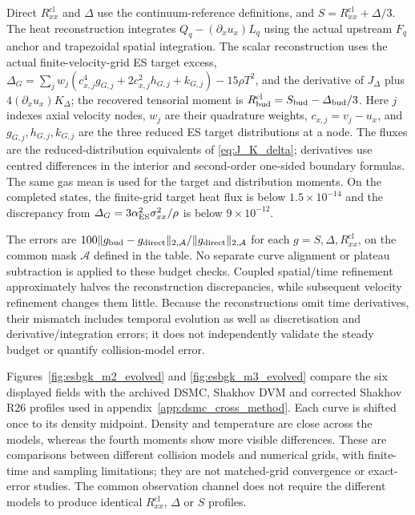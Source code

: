 \documentclass[lineno,paper]{JFM-FLM_Au}
\newenvironment{revision}{\nolinenumbers\begin{tcolorbox}[breakable,colback=revisionyellow,colframe=revisionyellow,boxrule=0pt,arc=0pt,left=5pt,right=5pt,top=5pt,bottom=5pt,before skip=6pt,after skip=6pt]\captionsetup{width=\linewidth}}{\end{tcolorbox}\linenumbers}
\newenvironment{revision}{}{}
\newcommand{\cl}{\mathrm{cl}}
\begin{document}
\begin{revision}
Direct $R^{\cl}_{xx}$ and $\Delta$ use the continuum-reference definitions, and $S=R^{\cl}_{xx}+\Delta/3$. The heat reconstruction integrates $Q_q-(\partial_xu_x)L_q$ using the actual upstream $F_q$ anchor and trapezoidal spatial integration. The scalar reconstruction uses the actual finite-velocity-grid ES target excess, $\Delta_G=\sum_j w_j(c_{x,j}^4g_{G,j}+2c_{x,j}^2h_{G,j}+k_{G,j})-15\rho T^2$, and the derivative of $J_\Delta$ plus $4(\partial_xu_x)K_\Delta$; the recovered tensorial moment is $R_{\rm bud}^{\cl}=S_{\rm bud}-\Delta_{\rm bud}/3$. Here $j$ indexes axial velocity nodes, $w_j$ are their quadrature weights, $c_{x,j}=v_j-u_x$, and $g_{G,j},h_{G,j},k_{G,j}$ are the three reduced ES target distributions at a node. The fluxes are the reduced-distribution equivalents of \eqref{eq:J_K_delta}; derivatives use centred differences in the interior and second-order one-sided boundary formulas. The same gas mean is used for the target and distribution moments. On the completed states, the finite-grid target heat flux is below $1.5\times10^{-14}$ and the discrepancy from $\Delta_G=3\alpha_{\rm ES}^2\sigma_{xx}^2/\rho$ is below $9\times10^{-12}$.

The errors are $100\|g_{\rm bud}-g_{\rm direct}\|_{2,\mathcal A}/\|g_{\rm direct}\|_{2,\mathcal A}$ for each $g=S,\Delta,R^{\cl}_{xx}$, on the common mask $\mathcal A$ defined in the table. No separate curve alignment or plateau subtraction is applied to these budget checks. Coupled spatial/time refinement approximately halves the reconstruction discrepancies, while subsequent velocity refinement changes them little. Because the reconstructions omit time derivatives, their mismatch includes temporal evolution as well as discretisation and derivative/integration errors; it does not independently validate the steady budget or quantify collision-model error.

Figures~\ref{fig:esbgk_m2_evolved} and \ref{fig:esbgk_m3_evolved} compare the six displayed fields with the archived DSMC, Shakhov DVM and corrected Shakhov R26 profiles used in appendix~\ref{app:dsmc_cross_method}. Each curve is shifted once to its density midpoint. Density and temperature are close across the models, whereas the fourth moments show more visible differences. These are comparisons between different collision models and numerical grids, with finite-time and sampling limitations; they are not matched-grid convergence or exact-error studies. The common observation channel does not require the different models to produce identical $R^{\cl}_{xx}$, $\Delta$ or $S$ profiles.
\end{revision}
\end{document}
